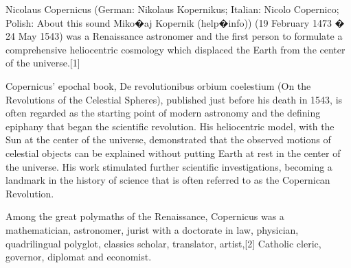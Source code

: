 Nicolaus Copernicus (German: Nikolaus Kopernikus; Italian: Nicolo Copernico; Polish: About this sound Miko�aj Kopernik (help�info)) (19 February 1473 � 24 May 1543) was a Renaissance astronomer and the first person to formulate a comprehensive heliocentric cosmology which displaced the Earth from the center of the universe.[1]

Copernicus' epochal book, De revolutionibus orbium coelestium (On the Revolutions of the Celestial Spheres), published just before his death in 1543, is often regarded as the starting point of modern astronomy and the defining epiphany that began the scientific revolution. His heliocentric model, with the Sun at the center of the universe, demonstrated that the observed motions of celestial objects can be explained without putting Earth at rest in the center of the universe. His work stimulated further scientific investigations, becoming a landmark in the history of science that is often referred to as the Copernican Revolution.

Among the great polymaths of the Renaissance, Copernicus was a mathematician, astronomer, jurist with a doctorate in law, physician, quadrilingual polyglot, classics scholar, translator, artist,[2] Catholic cleric, governor, diplomat and economist.




